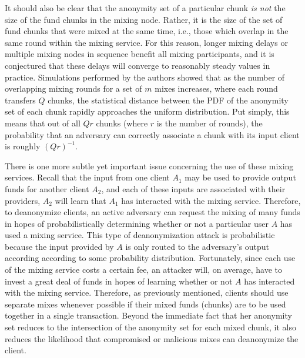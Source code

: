 It should also be clear that the anonymity set of a particular chunk \emph{is not} the size of the fund chunks in the mixing node. Rather, it is the size of the set of fund chunks that were mixed at the same time, i.e., those which overlap in the same round within the mixing service. For this reason, longer mixing delays or multiple mixing nodes in sequence benefit all mixing participants, and it is conjectured that these delays will converge to reasonably steady values in practice. Simulations performed by the authors showed that as the number of overlapping mixing rounds for a set of $m$ mixes increases, where each round transfers $Q$ chunks, the statistical distance between the PDF of the anonymity set of each chunk rapidly approaches the uniform distribution. Put simply, this means that out of all $Qr$ chunks (where $r$ is the number of rounds), the probability that an adversary can correctly associate a chunk with its input client is roughly $(Qr)^{-1}$.


There is one more subtle yet important issue concerning the use of these mixing services. Recall that the input from one client $A_1$ may be used to provide output funds for another client $A_2$, and each of these inputs are associated with their providers, $A_2$ will learn that $A_1$ has interacted with the mixing service. Therefore, to deanonymize clients, an active adversary can request the mixing of many funds in hopes of probabilistically determining whether or not a particular user $A$ has used a mixing service. This type of deanonymization attack is probabilistic because the input provided by $A$ is only routed to the adversary's output according according to some probability distribution. Fortunately, since each use of the mixing service costs a certain fee, an attacker will, on average, have to invest a great deal of funds in hopes of learning whether or not $A$ has interacted with the mixing service. Therefore, as previously mentioned, clients should use separate mixes whenever possible if their mixed funds (chunks) are to be used together in a single transaction. Beyond the immediate fact that her anonymity set reduces to the intersection of the anonymity set for each mixed chunk, it also reduces the likelihood that compromised or malicious mixes can deanonymize the client. 

